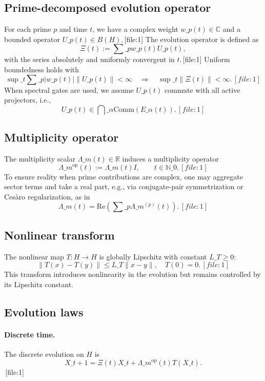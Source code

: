 \documentclass[11pt]{article}
\begin{document}
\subsection{Prime-decomposed evolution operator}

For each prime $p$ and time $t$, we have a complex weight $w\_p(t)\in\mathbb{C}$ and a bounded operator $U\_p(t)\in B(H)$.\,[file:1] The evolution operator is defined as
\[
\Xi(t) := \sum\_p w\_p(t) U\_p(t),
\]
with the series absolutely and uniformly convergent in $t$.\,[file:1] Uniform boundedness holds with
\[
\sup\_t \sum\_p |w\_p(t)|\|U\_p(t)\| < \infty \quad\Rightarrow\quad \sup\_t\|\Xi(t)\| < \infty.\,[file:1]
\]
When spectral gates are used, we assume $U\_p(t)$ commute with all active projectors, i.e.,
\[
U\_p(t)\in \bigcap\_\alpha \mathrm{Comm}(E\_\alpha(t)).\,[file:1]
\]

\subsection{Multiplicity operator}

The multiplicity scalar $\Lambda\_m(t)\in\mathbb{R}$ induces a multiplicity operator
\[
\Lambda\_m^{\mathrm{op}}(t) := \Lambda\_m(t) I, \qquad t\in\mathbb{N}\_0.\,[file:1]
\]
To ensure reality when prime contributions are complex, one may aggregate sector terms and take a real part, e.g., via conjugate-pair symmetrization or Cesàro regularization, as in
\[
\Lambda\_m(t) = \mathrm{Re}\left(\sum\_p \Lambda\_m^{(p)}(t)\right).\,[file:1]
\]

\subsection{Nonlinear transform}

The nonlinear map $T:H\to H$ is globally Lipschitz with constant $L\_T\ge 0$:
\[
\|T(x)-T(y)\|\le L\_T\|x-y\|,\quad T(0)=0.\,[file:1]
\]
This transform introduces nonlinearity in the evolution but remains controlled by its Lipschitz constant.

\subsection{Evolution laws}

\paragraph{Discrete time.} The discrete evolution on $H$ is
\begin{equation}
X\_{t+1} = \Xi(t)X\_t + \Lambda\_m^{\mathrm{op}}(t) T(X\_t).\label{eq:outer-discrete}
\end{equation}
\,[file:1]
\end{document}
